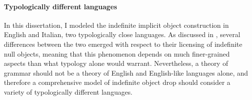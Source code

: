 

\paragraph{Typologically different languages}
In this dissertation, I modeled the indefinite implicit object construction in English and Italian, two typologically close languages. As discussed in , several differences between the two emerged with respect to their licensing of indefinite null objects, meaning that this phenomenon depends on much finer-grained aspects than what typology alone would warrant. Nevertheless, a theory of grammar should not be a theory of English and English-like languages alone, and therefore a comprehensive model of indefinite object drop should consider a variety of typologically different languages.\\

